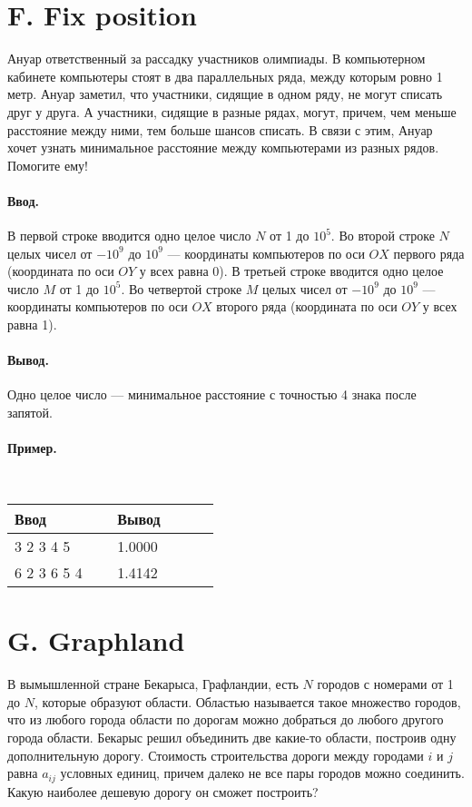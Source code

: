\documentclass[12pt, a5paper]{article}
\newcommand{\informat}[1]
{
	\paragraph{Ввод.\\} #1
}
\newcommand{\outformat}[1]
{
	\paragraph{Вывод.\\} #1
}
\newcommand{\examplee}[4]
{
	\paragraph{Пример.\\}
	{\tt
	\begin{tabular}{|p{0.4\linewidth}|p{0.4\linewidth}|}
	\hline
	Ввод 	& Вывод  	\\
	\hline
	#1 		& #2 		\\
	\hline
	#3		& #4		\\
	\hline
	\end{tabular}
	}
}
\begin{document}
\section*{F. Fix position}


Ануар ответственный за рассадку участников олимпиады. В компьютерном кабинете компьютеры стоят в два параллельных ряда, между которым ровно 1 метр. Ануар заметил, что участники, сидящие в одном ряду, не могут списать друг у друга. А участники, сидящие в разные рядах, могут, причем, чем меньше расстояние между ними, тем больше шансов списать. В связи с этим, Ануар хочет узнать минимальное расстояние между компьютерами из разных рядов. Помогите ему!

\informat{В первой строке вводится одно целое число $N$ от 1 до $10^5$. \newline 
Во второй строке $N$ целых чисел от $-10^9$ до $10^9$ --- координаты компьютеров по оси $OX$ первого ряда (координата по оси $OY$ у всех равна 0). \newline
В третьей строке вводится одно целое число $M$ от 1 до $10^5$. \newline
Во четвертой строке $M$ целых чисел от $-10^9$ до $10^9$ --- координаты компьютеров по оси $OX$ второго ряда (координата по оси $OY$ у всех равна 1).}

\outformat{Одно целое число --- минимальное расстояние с точностью 4 знака после запятой.}

\examplee
{3 \newline
1 2 3 \newline
3 \newline
3 4 5}
{1.0000}
{6 \newline
1 2 3 6 5 4 \newline
1 \newline
0}
{1.4142}



\section*{G. Graphland}


В вымышленной стране Бекарыса, Графландии, есть $N$ городов с номерами от 1 до $N$, которые образуют области. Областью называется такое множество городов, что из любого города области по дорогам можно добраться до любого другого города области. Бекарыс решил объединить две какие-то области, построив одну дополнительную дорогу. Стоимость строительства дороги между городами $i$ и $j$ равна $a_{ij}$ условных единиц, причем далеко не все пары городов можно соединить. Какую наиболее дешевую дорогу он сможет построить?
\end{document}
